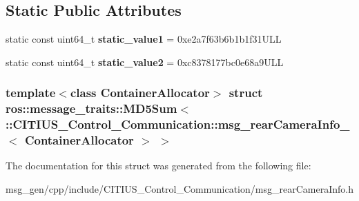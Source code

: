 \subsection*{\-Static \-Public \-Attributes}
\begin{DoxyCompactItemize}
\item 
\hypertarget{structros_1_1message__traits_1_1_m_d5_sum_3_01_1_1_c_i_t_i_u_s___control___communication_1_1msg_6de824479c4227bab6cb3eb7f53bd65a_a717e7f171bec3c3a1af444f75b6253ed}{static const uint64\-\_\-t {\bfseries static\-\_\-value1} = 0xe2a7f63b6b1b1f31\-U\-L\-L}\label{structros_1_1message__traits_1_1_m_d5_sum_3_01_1_1_c_i_t_i_u_s___control___communication_1_1msg_6de824479c4227bab6cb3eb7f53bd65a_a717e7f171bec3c3a1af444f75b6253ed}

\item 
\hypertarget{structros_1_1message__traits_1_1_m_d5_sum_3_01_1_1_c_i_t_i_u_s___control___communication_1_1msg_6de824479c4227bab6cb3eb7f53bd65a_a36414bf8c789b7aa5de689b255710139}{static const uint64\-\_\-t {\bfseries static\-\_\-value2} = 0xc8378177bc0e68a9\-U\-L\-L}\label{structros_1_1message__traits_1_1_m_d5_sum_3_01_1_1_c_i_t_i_u_s___control___communication_1_1msg_6de824479c4227bab6cb3eb7f53bd65a_a36414bf8c789b7aa5de689b255710139}

\end{DoxyCompactItemize}
\subsubsection*{template$<$class Container\-Allocator$>$ struct ros\-::message\-\_\-traits\-::\-M\-D5\-Sum$<$ \-::\-C\-I\-T\-I\-U\-S\-\_\-\-Control\-\_\-\-Communication\-::msg\-\_\-rear\-Camera\-Info\-\_\-$<$ Container\-Allocator $>$ $>$}



\-The documentation for this struct was generated from the following file\-:\begin{DoxyCompactItemize}
\item 
msg\-\_\-gen/cpp/include/\-C\-I\-T\-I\-U\-S\-\_\-\-Control\-\_\-\-Communication/msg\-\_\-rear\-Camera\-Info.\-h\end{DoxyCompactItemize}
